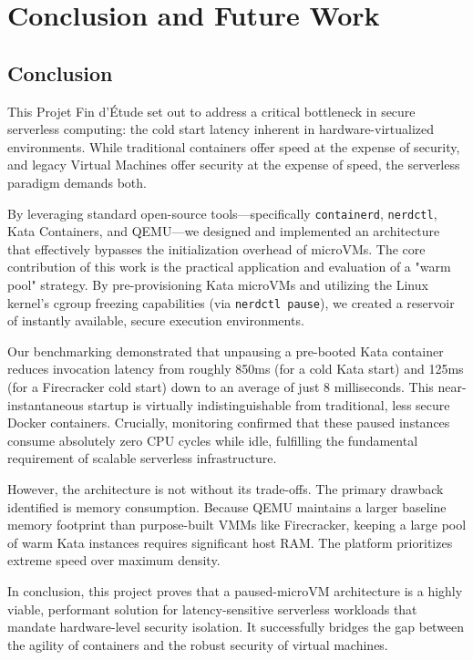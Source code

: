 \chapter{Conclusion and Future Work}

\section{Conclusion}
This Projet Fin d'\'Etude set out to address a critical bottleneck in secure serverless computing: the cold start latency inherent in hardware-virtualized environments. While traditional containers offer speed at the expense of security, and legacy Virtual Machines offer security at the expense of speed, the serverless paradigm demands both.

By leveraging standard open-source tools---specifically \texttt{containerd}, \texttt{nerdctl}, Kata Containers, and QEMU---we designed and implemented an architecture that effectively bypasses the initialization overhead of microVMs. The core contribution of this work is the practical application and evaluation of a "warm pool" strategy. By pre-provisioning Kata microVMs and utilizing the Linux kernel's cgroup freezing capabilities (via \texttt{nerdctl pause}), we created a reservoir of instantly available, secure execution environments.

Our benchmarking demonstrated that unpausing a pre-booted Kata container reduces invocation latency from roughly 850ms (for a cold Kata start) and 125ms (for a Firecracker cold start) down to an average of just 8 milliseconds. This near-instantaneous startup is virtually indistinguishable from traditional, less secure Docker containers. Crucially, monitoring confirmed that these paused instances consume absolutely zero CPU cycles while idle, fulfilling the fundamental requirement of scalable serverless infrastructure.

However, the architecture is not without its trade-offs. The primary drawback identified is memory consumption. Because QEMU maintains a larger baseline memory footprint than purpose-built VMMs like Firecracker, keeping a large pool of warm Kata instances requires significant host RAM. The platform prioritizes extreme speed over maximum density.

In conclusion, this project proves that a paused-microVM architecture is a highly viable, performant solution for latency-sensitive serverless workloads that mandate hardware-level security isolation. It successfully bridges the gap between the agility of containers and the robust security of virtual machines.

